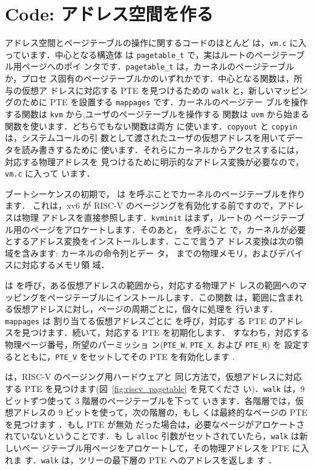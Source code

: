 \section{Code: アドレス空間を作る}

アドレス空間とページテーブルの操作に関するコードのほとんど
は，\texttt{vm.c}  に入っています．中心となる構造体
は \texttt{pagetable\_t} で，実はルートのページテーブル用ページへのポイ
ンタです．\texttt{pagetable\_t} は，カーネルのページテーブルか，プロセ
ス固有のページテーブルかのいずれかです．中心となる関数は，所与の仮想ア
ドレスに対応する PTE を見つけるための \texttt{walk} と，新しいマッピン
グのために PTE を設置する \texttt{mappages} です．カーネルのページテー
ブルを操作する関数は \texttt{kvm} から,ユーザのページテーブルを操作する
関数は \texttt{uvm} から始まる関数を使います．どちらでもない関数は両方
に使います．\texttt{copyout} と \texttt{copyin} は，システムコールの引
数として渡されたユーザの仮想アドレスを用いてデータを読み書きするために
使います．それらにカーネルからアクセスするには，対応する物理アドレスを
見つけるために明示的なアドレス変換が必要なので，\texttt{vm.c} に入って
います．

ブートシーケンスの初期で， は 
を呼ぶことでカーネルのページテーブルを作ります．
これは，xv6 が RISC-V のページングを有効化する前ですので，アドレスは物理
アドレスを直接参照します．\lstinline{kvminit} はまず，ルートの
ページテーブル用のページをアロケートします．そのあと， を呼ぶこと
で，カーネルが必要とするアドレス変換をインストールします．ここで言うア
ドレス変換は次の領域を含みます: カーネルの命令列とデー
タ， までの物理メモリ，およびデバイスに対応するメモリ領
域．

  は 
 を呼び，ある仮想アドレスの範囲から，対応する物理アド
レスの範囲へのマッピングをページテーブルにインストールします．この関数
は，範囲に含まれる仮想アドレスに対し，ページの周期ごとに，個々に処理を
行います．\lstinline{mappages} は
割り当てる仮想アドレスごとに  を呼び，対応す
る PTE のアドレスを見つけます．続いて，対応する PTE を初期化します．
すなわち，対応する物理ページ番号，所望のパーミッショ
ン(\lstinline{PTE_W}, \lstinline{PTE_X}, および \lstinline{PTE_R}) を
設定するとともに，\lstinline{PTE_V} をセットしてその PTE を有効化します
.

は，RISC-V のページング用ハードウェアと
同じ方法で，仮想アドレスに対応する PTE を見つけます(図~\ref{fig:riscv_pagetable} を見てくださ
い)．\lstinline{walk} は，9ビットずつ使って 3 階層のページテーブルを下って
いきます．各階層では，仮想アドレスの 9 ビットを使って，次の階層の，もし
くは最終的なページの PTE を見つけます ．もし PTE が無効
だった場合は，必要なページがアロケートされていないということです．も
し \lstinline{alloc} 引数がセットされていたら，\lstinline{walk} は新しいペー
ジテーブル用ページをアロケートして，その物理アドレスを PTE に入れま
す．\lstinline{walk} は，ツリーの最下層の PTE へのアドレスを返しま
す ．

